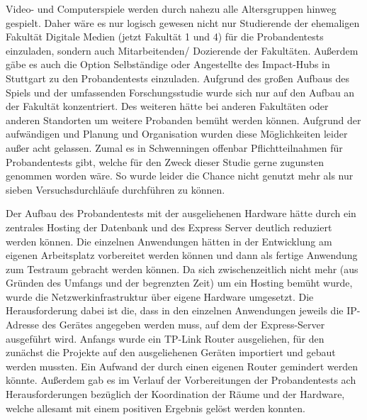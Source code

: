 Video- und Computerspiele werden durch nahezu alle Altersgruppen hinweg gespielt. Daher wäre es nur logisch gewesen nicht nur Studierende der ehemaligen Fakultät Digitale Medien (jetzt Fakultät 1 und 4) für die Probandentests einzuladen, sondern auch Mitarbeitenden/ Dozierende der Fakultäten. Außerdem gäbe es auch die Option Selbständige oder Angestellte des Impact-Hubs in Stuttgart zu den Probandentests einzuladen. Aufgrund des großen Aufbaus des Spiels und der umfassenden Forschungsstudie wurde sich nur auf den Aufbau an der Fakultät konzentriert. Des weiteren hätte bei anderen Fakultäten oder anderen Standorten um weitere Probanden bemüht werden können. Aufgrund der aufwändigen und Planung und Organisation wurden diese Möglichkeiten leider außer acht gelassen. Zumal es in Schwenningen offenbar Pflichtteilnahmen für Probandentests gibt, welche für den Zweck dieser Studie gerne zugunsten genommen worden wäre. So wurde leider die Chance nicht genutzt mehr als nur sieben Versuchsdurchläufe durchführen zu können.


Der Aufbau des Probandentests mit der ausgeliehenen Hardware hätte durch ein zentrales Hosting der Datenbank und des Express Server deutlich reduziert werden können. Die einzelnen Anwendungen hätten in der Entwicklung am eigenen Arbeitsplatz vorbereitet werden können und dann als fertige Anwendung zum Testraum gebracht werden können. Da sich zwischenzeitlich nicht mehr (aus Gründen des Umfangs und der begrenzten Zeit) um ein Hosting bemüht wurde, wurde die Netzwerkinfrastruktur über eigene Hardware umgesetzt. Die Herausforderung dabei ist die, dass in den einzelnen Anwendungen jeweils die IP-Adresse des Gerätes angegeben werden muss, auf dem der Express-Server ausgeführt wird. Anfangs wurde ein TP-Link Router ausgeliehen, für den zunächst die Projekte auf den ausgeliehenen Geräten importiert und gebaut werden mussten. Ein Aufwand der durch einen eigenen Router gemindert werden könnte. Außerdem gab es im Verlauf der Vorbereitungen der Probandentests ach Herausforderungen bezüglich der Koordination der Räume und der Hardware, welche allesamt mit einem positiven Ergebnis gelöst werden konnten.

